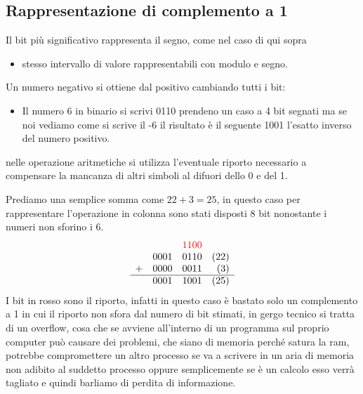 \subsection{Rappresentazione di complemento a 1}
\label{sec:rappcompa1}
Il bit più significativo rappresenta il segno, come nel caso di qui sopra
\begin{itemize}
\item stesso intervallo di valore rappresentabili con modulo e segno.
\end{itemize}
Un numero negativo si ottiene dal positivo cambiando tutti i bit:
\begin{itemize}
\item Il numero 6 in binario si scrivi 0110 prendeno un caso a 4 bit segnati ma
  se noi vediamo come si scrive il -6 il risultato è il seguente 1001 l'esatto inverso
  del numero positivo.
\end{itemize}
nelle operazione aritmetiche si utilizza l'eventuale riporto necessario a compensare
la mancanza di altri simboli al difuori dello 0 e del 1.
\begin{esempio}
  Prediamo una semplice somma come $22+3=25$, in questo caso per rappresentare
  l'operazione in colonna sono stati disposti 8 bit nonostante i numeri non sforino
  i 6.
  \begin{equation}
    \label{eq:compa1}
    \begin{array}{lccr}
      &&{\color{red}1100}&\\
       & 0001 & 0110 & (22)\\
      +& 0000 & 0011 & (3)\\\hline
       & 0001 & 1001 & (25)
    \end{array}
  \end{equation}
  I bit in rosso sono il riporto, infatti in questo caso è bastato solo un complemento a
  1 in cui il riporto non sfora dal numero di bit stimati, in gergo tecnico si tratta
  di un overflow, cosa che se avviene all'interno di un programma sul proprio computer
  può causare dei problemi, che siano di memoria perché satura la ram, potrebbe
  compromettere un altro processo se va a scrivere in un aria di memoria non adibito
  al suddetto processo oppure semplicemente se è un calcolo esso verrà tagliato e
  quindi barliamo di perdita di informazione.
\end{esempio}
